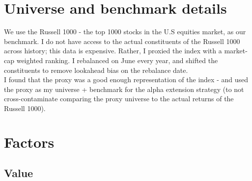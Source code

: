\documentclass[12pt]{article}
\begin{document}
\section{Universe and benchmark details}

We use the Russell 1000 - the top 1000 stocks in the U.S equities market, as our benchmark. I do not have access to the actual constituents of the Russell 1000 across history; this data is expensive. Rather,
I proxied the index with a market-cap weighted ranking. I rebalanced on June every year, and shifted
the constituents to remove lookahead bias on the rebalance date.
\newline \\
I found that the proxy was a good enough representation of the index - and used the proxy as my universe + 
benchmark for the alpha extension strategy (to not cross-contaminate comparing the proxy universe to the 
actual returns of the Russell 1000).

\section{Factors}
\subsection{Value}
\end{document}
